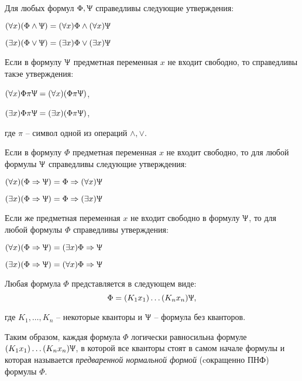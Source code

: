 \begin{theorem}
    Для любых формул $\Phi,\Uppsi$ справедливы следующие утверждения:

    $(\forall x)(\Phi\land\Uppsi) = (\forall x)\Phi\land(\forall x)\Uppsi$

    $(\exists x)(\Phi\lor\Uppsi) = (\exists x)\Phi\lor(\exists x)\Uppsi$
    
    Если в формулу $\Uppsi$ предметная переменная $x$ не входит свободно, то справедливы такэе утверждения:

    $(\forall x)\Phi\pi\Uppsi = (\forall x)(\Phi\pi\Uppsi)$,

    $(\exists x)\Phi\pi\Uppsi = (\exists x)(\Phi\pi\Uppsi)$,

    где $\pi$ -- символ одной из операций $\land,\lor$.
\end{theorem}

\begin{theorem}
    Если в формулу $\Phi$ предметная переменная $x$ не входит свободно, то для любой формулы $\Uppsi$ справедливы следующие утверждения:

    $(\forall x)(\Phi\Rightarrow\Uppsi) = \Phi \Rightarrow (\forall x)\Uppsi$

    $(\exists x)(\Phi\Rightarrow\Uppsi) = \Phi \Rightarrow (\exists x)\Uppsi$

    Если же предметная переменная $x$ не входит свободно в формулу $\Uppsi$, то для любой формулы $\Phi$ справедливы утверждения:

    $(\forall x)(\Phi\Rightarrow\Uppsi) = (\exists x)\Phi\Rightarrow\Uppsi$

    $(\exists x)(\Phi\Rightarrow\Uppsi) = (\forall x)\Phi\Rightarrow\Uppsi$
\end{theorem}

\begin{corollary}[Следствие 7]
    Любая формула $\Phi$ представляется в следующем виде:
    $$\Phi = (K_1 x_1)\ldots(K_n x_n)\Uppsi,$$
    
    где $K_1,\ldots,K_n$ -- некоторые кванторы и $\Uppsi$ -- формула без кванторов.

    Таким образом, каждая формула $\Phi$ логически равносильна формуле $(K_1 x_1)\ldots(K_n x_n)\Uppsi$, в которой все кванторы стоят в самом начале формулы и которая называется \textit{предваренной нормальной формой} (cокращенно ПНФ) формулы $\Phi$.

\end{corollary}